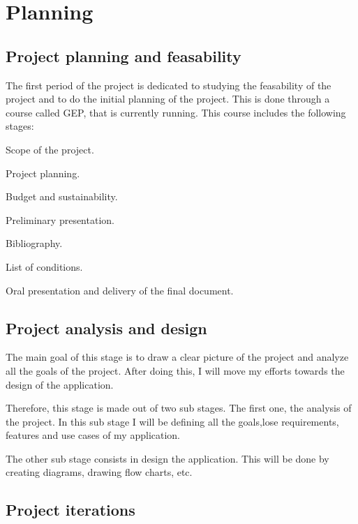 
\section{Planning}

\subsection{Project planning and feasability}

The first period of the project is dedicated to studying the feasability of the
project and to do the initial planning of the project. This is done through a
course called GEP, that is currently running. This course includes the
following stages:

\mylist
  \item Scope of the project.
  \item Project planning.
  \item Budget and sustainability.
  \item Preliminary presentation.
  \item Bibliography.
  \item List of conditions.
  \item Oral presentation and delivery of the final document.
\mylistend

\subsection{Project analysis and design}

The main goal of this stage is to draw a clear picture of the project and
analyze all the goals of the project. After doing this, I will move my efforts
towards the design of the application.

Therefore, this stage is made out of two sub stages. The first one, the
analysis of the project. In this sub stage I will be defining all the goals,lose
requirements, features and use cases of my application.

The other sub stage consists in design the application. This will be done by
creating diagrams, drawing flow charts, etc.

\subsection{Project iterations}

